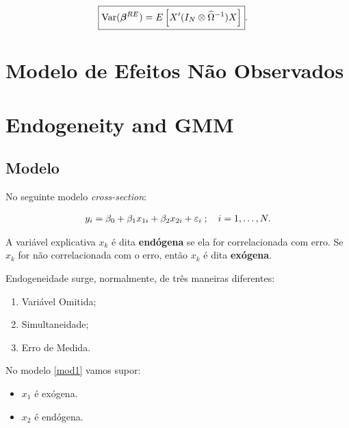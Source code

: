 \documentclass[11pt, oneside, a4paper, article]{article}
\numberwithin{equation}{section}
\begin{document}
\begin{description}
\begin{description}
\vspace{-1 em}
\begin{align*} 
	\Aboxed{
\Var( \mbs{\beta}^{RE} ) = 
E
\left[ X' ( I_{N} \otimes \widehat{\Omega}^{-1} ) X \right] }.
\end{align*}


\clearpage
\section{Modelo de Efeitos Não Observados}
\citet[C.10 -- Basic Linear Unobserved Effects Panel Data Models]{wool-2010}

\clearpage
\section{Endogeneity and GMM}


\subsection*{Modelo}

No seguinte modelo \textit{cross-section}:

\vspace{-1 em}
\begin{align} \label{mod1}
	y_{i} = \beta_{0} + \beta_{1} x_{1i} + \beta_{2} x_{2i} + \varepsilon_{i}
	\; ; \quad i = 1, \dots, N.
\end{align}

\noindent
A variável explicativa $x_{k}$ é dita \textbf{endógena} se ela for correlacionada com erro.
Se $x_{k}$ for não correlacionada com o erro, então $x_{k}$ é dita \textbf{exógena}.

Endogeneidade surge, normalmente, de três maneiras diferentes:

\begin{enumerate}\itemsep0pt
	\item Variável Omitida;
	\item Simultaneidade;
	\item Erro de Medida.
\end{enumerate}

No modelo \eqref{mod1} vamos supor:

\begin{itemize}\itemsep0pt
	\item $x_{1}$ é exógena.
	\item $x_{2}$ é endógena.
\end{itemize}


\end{description}
\end{description}
\end{document}
